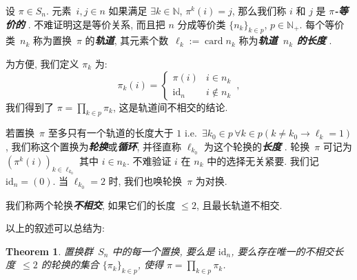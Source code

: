 \documentclass[openany]{ctexbook}
\newcommand*{\indexbf}[1]{\emph{\textbf{#1}}\index{#1}} %
\theoremstyle{plain}
\newtheorem{theorem}{Theorem}[section] %
\theoremstyle{definition}
\newcommand*{\id}{\mathrm{id}} %
\newcommand{\emphbf}[1]{\emph{\textbf{#1}}}
\DeclareMathOperator{\card}{card}
\begin{document}
设 $\pi \in S_n$. 
元素~$i,j \in n$ 如果满足 $\exists k \in \mathbb N$, $\pi^k(i) = j$, 那么我们称 $i$ 和 $j$ 是 \emphbf{$\pi$-等价的}%
	.
不难证明这是等价关系, 而且把 $n$ 分成等价类 $\{n_k\}_{k \in p}$, $p \in \mathbb N_+$.
每个等价类~$n_k$ 称为置换~$\pi$ 的\indexbf{轨道}, 其元素个数~$\ell_k := \card n_k$ 称为\emphbf{轨道~$n_k$ 的长度}%
	.

为方便, 我们定义 $\pi_k$ 为:
\begin{equation*}
	\pi_k(i) = 
	\begin{cases}
		\pi(i) & i \in n_k \\
		\id_n & i \notin n_k
	\end{cases}\,,
\end{equation*}
我们得到了 $\pi = \prod_{k \in p} \pi_k$, 这是轨道间不相交的结论.

若置换~$\pi$ 至多只有一个轨道的长度大于 $1$ i.e.\ $
	\exists k_0 \in p \,\forall k \in p (k \neq k_0 \to \ell_k = 1)
$,  我们称这个置换为\indexbf{轮换}或\indexbf{循环}, 并径直称 $\ell_{k_0}$ 为这个轮换的\emphbf{长度}%
	.
轮换~$\pi$ 可记为 $(\pi^k (i))_{k \in \ell_{k_0}}$ 其中 $i \in n_k$. 不难验证 $i$ 在 $n_k$ 中的选择无关紧要. 我们记 $\id_n = (0)$. 
当 $\ell_{k_0} = 2 $ 时, 我们也唤轮换~$\pi$ 为对换.

我们称两个轮换\indexbf{不相交}, 如果它们的长度 $\leq 2$, 且最长轨道不相交.

以上的叙述可以总结为:
\begin{theorem}\label{theorem:置换的轮换分解}
	置换群~$S_n$ 中的每一个置换, 要么是 $\id_n$, 要么存在唯一的不相交长度~$\leq 2$ 的轮换的集合 $\{\pi_k\}_{k \in p}$, 使得 $\pi = \prod_{k \in p} \pi_k$.
\end{theorem}
\end{document}
